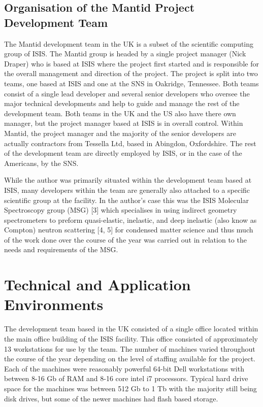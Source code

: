 \documentclass[paper=a4, fontsize=11pt]{scrartcl}	%
\numberwithin{equation}{section}															%
\numberwithin{figure}{section}																%
\numberwithin{table}{section}
\begin{document}
\subsection{Organisation of the Mantid Project Development
Team}\label{organisation-of-the-mantid-project-development-team}

The Mantid development team in the UK is a subset of the scientific
computing group of ISIS. The Mantid group is headed by a single project
manager (Nick Draper) who is based at ISIS where the project first
started and is responsible for the overall management and direction of
the project. The project is split into two teams, one based at ISIS and
one at the SNS in Oakridge, Tennessee. Both teams consist of a single
lead developer and several senior developers who oversee the major
technical developments and help to guide and manage the rest of the
development team. Both teams in the UK and the US also have there own
manager, but the project manager based at ISIS is in overall control.
Within Mantid, the project manager and the majority of the senior
developers are actually contractors from Tessella Ltd, based in
Abingdon, Oxfordshire. The rest of the development team are directly
employed by ISIS, or in the case of the Americans, by the SNS.

While the author was primarily situated within the development team
based at ISIS, many developers within the team are generally also
attached to a specific scientific group at the facility. In the author's
case this was the ISIS Molecular Spectroscopy group (MSG) {[}3{]} which
specialises in using indirect geometry spectrometers to preform
quasi-elastic, inelastic, and deep inelastic (also know as Compton)
neutron scattering {[}4, 5{]} for condensed matter science and thus much
of the work done over the course of the year was carried out in relation
to the needs and requirements of the MSG.

\section{Technical and Application
Environments}\label{technical-and-application-environments}

The development team based in the UK consisted of a single office
located within the main office building of the ISIS facility. This
office consisted of approximately 13 workstations for use by the team.
The number of machines varied throughout the course of the year
depending on the level of staffing available for the project. Each of
the machines were reasonably powerful 64-bit Dell workstations with
between 8-16 Gb of RAM and 8-16 core intel i7 processors. Typical hard
drive space for the machines was between 512 Gb to 1 Tb with the
majority still being disk drives, but some of the newer machines had
flash based storage.
\end{document}

